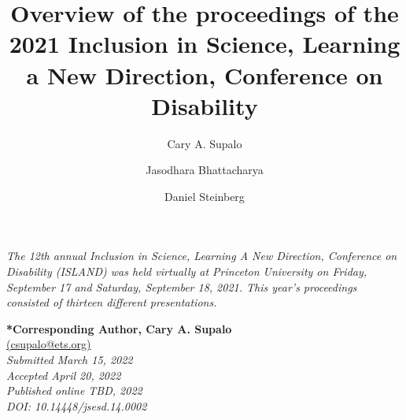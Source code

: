 \documentclass[11pt]{sig-alternate}
\makeatletter
\let\oldabstract\abstract
\let\oldendabstract\endabstract
\renewenvironment{abstract}
{\renewenvironment{quotation}%
               {\list{}{\addtolength{\leftmargin}{1em} %
                        \listparindent 1.5em%
                        \itemindent    \listparindent%
                        \rightmargin   \leftmargin%
                        \parsep        \z@ \@plus\p@}%
                \item\relax}%
               {\endlist}%
\oldabstract}
{\oldendabstract}
\makeatother
\begin{document}
\title{Overview of the proceedings of the 2021 Inclusion in Science, Learning a New Direction, Conference on Disability }

\author[1]{\large \color{blue} Cary A. Supalo}
\author[2]{\large \color{blue} Jasodhara Bhattacharya}
\author[2]{\large \color{blue} Daniel Steinberg}


\toappear{}

\maketitle
\begin{@twocolumnfalse} 

\begin{abstract}
\begin{large}
\item 
\textit {The 12th annual Inclusion in Science, Learning A New Direction, Conference on Disability (ISLAND) was held virtually at Princeton University on Friday, September 17 and Saturday, September 18, 2021. This year’s proceedings consisted of thirteen different presentations.}
\end{large}
\end{abstract}
\end{@twocolumnfalse}




\textbf{*Corresponding Author, Cary A. Supalo}\\
\href{mailto:csupalo@ets.org}{(csupalo@ets.org)}\\
\textit{Submitted March 15, 2022 }\\
\textit{Accepted April 20, 2022} \\
\textit{Published online TBD, 2022}\\
\textit{DOI: 10.14448/jsesd.14.0002}\\

\pagebreak
\pagebreak

\vspace{5mm}
\end{document}
